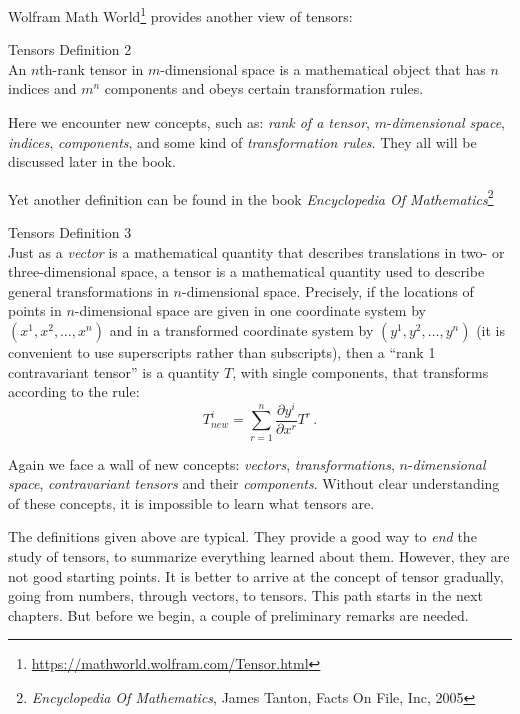 Wolfram Math World\footnote{\url{https://mathworld.wolfram.com/Tensor.html}}
provides another view of tensors:
\begin{mydef}{Tensors Definition 2}\\
  \small
An $n$th-rank tensor in $m$-dimensional space is a mathematical object
that has $n$ indices and $m^n$ components and obeys certain
transformation rules.
\end{mydef}
Here we encounter new concepts, such as: \emph{rank of a tensor},
$m$-\emph{dimensional space}, \emph{indices}, \emph{components}, and
some kind of \emph{transformation rules}. They all will be discussed
later in the book.

Yet another definition can be found in the book \emph{Encyclopedia Of
Mathematics}\footnote{\emph{Encyclopedia Of Mathematics}, James
Tanton, Facts On File, Inc, 2005}

\begin{mydef}{Tensors Definition 3}\\
  \small
Just as a \emph{vector} is a mathematical quantity
that describes translations in two- or three-dimensional
space, a tensor is a mathematical quantity used to
describe general transformations in $n$-dimensional
space. Precisely, if the locations of points in $n$-dimensional
space are given in one coordinate system by
$(x^1,x^2,…,x^n)$ and in a transformed coordinate system
by $(y^1, y^2,…,y^n)$ (it is convenient to use superscripts
rather than subscripts), then a “rank 1 contravariant
tensor” is a quantity $T$, with single components, that
transforms according to the rule:
\begin{equation*}
	T^i_{new} = \sum\limits_{r=1}^{n} \frac{\partial y^i}{\partial x^r} T^r\,.
\end{equation*}
\end{mydef}
Again we face a wall of new concepts: \emph{vectors},
\emph{transformations}, $n$-\emph{dimensional space},
\emph{contravariant tensors} and their \emph{components}. Without
clear understanding of these concepts, it is impossible to learn what
tensors are.


The definitions given above are typical. They provide a good way to \emph{end}
the study of tensors, to summarize everything learned about
them. However, they are not good starting points. It is better to
arrive at the concept of tensor gradually, going from numbers, through
vectors, to tensors. This path starts in the next chapters. But before we
 begin, a couple of preliminary remarks are needed.

